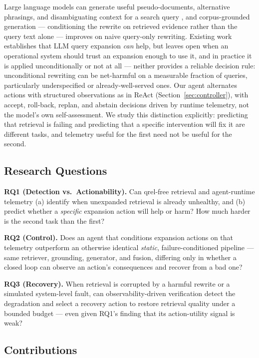 \documentclass[conference]{IEEEtran}
\begin{document}
Large language models can generate useful pseudo-documents, alternative
phrasings, and disambiguating context for a search query
\cite{query2doc,mugi}, and corpus-grounded generation --- conditioning
the rewrite on retrieved evidence rather than the query text alone ---
improves on naive query-only rewriting. Existing work establishes that
LLM query expansion \emph{can} help, but leaves open when an
operational system should trust an expansion enough to use it, and in
practice it is applied unconditionally or not at all --- neither
provides a reliable decision rule: unconditional rewriting can be
net-harmful on a measurable fraction of queries, particularly
underspecified or already-well-served ones. Our agent alternates
actions with structured observations as in ReAct
\cite{react} (Section~\ref{sec:controller}), with accept, roll-back,
replan, and abstain decisions driven by runtime telemetry, not the
model's own self-assessment. We study this distinction explicitly:
predicting that retrieval is
failing and predicting that a specific intervention will fix it are
different tasks, and telemetry useful for the first need not be useful
for the second.

\subsection{Research Questions}

\textbf{RQ1 (Detection vs.\ Actionability).} Can qrel-free retrieval
and agent-runtime telemetry (a) identify when unexpanded retrieval is
already unhealthy, and (b) predict whether a \emph{specific} expansion
action will help or harm? How much harder is the second task than the
first?

\textbf{RQ2 (Control).} Does an agent that conditions expansion actions
on that telemetry outperform an otherwise identical \emph{static},
failure-conditioned pipeline --- same retriever, grounding, generator,
and fusion, differing only in whether a closed loop can observe an
action's consequences and recover from a bad one?

\textbf{RQ3 (Recovery).} When retrieval is corrupted by a harmful
rewrite or a simulated system-level fault, can observability-driven
verification detect the degradation and select a recovery action to
restore retrieval quality under a bounded budget --- even given RQ1's
finding that its action-utility signal is weak?

\subsection{Contributions}
\end{document}
